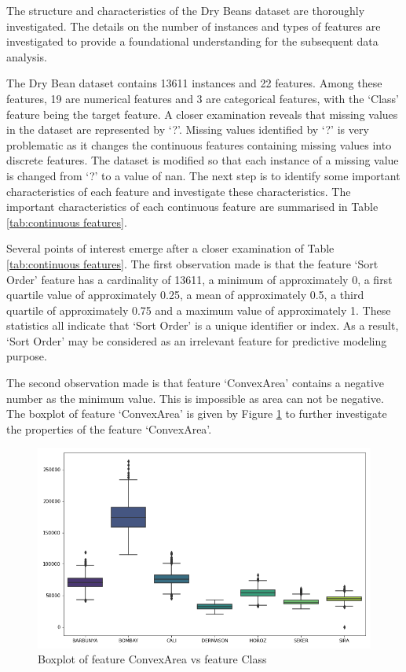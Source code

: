 \documentclass[10pt, conference]{IEEEtran}
\begin{document}
The structure and characteristics of the Dry Beans dataset are thoroughly investigated. The details on the number of instances
and types of features are investigated to provide a foundational understanding for the subsequent data analysis.

The Dry Bean dataset contains 13611 instances and 22 features. Among these features, 19 are numerical features and 3 are
categorical features, with the `Class' feature being the target feature. A closer examination reveals that
missing values in the dataset are represented by `?'. Missing values identified by `?' is very problematic as it changes
the continuous features containing missing values into discrete features. The dataset is modified so that each instance
of a missing value is changed from `?' to a value of \acrfull{nan}. The next step is to identify some important
characteristics of each feature and investigate these characteristics. The important characteristics of each
continuous feature are summarised in Table \ref{tab:continuous features}.

Several points of interest emerge after a closer examination of Table \ref{tab:continuous features}. The first
observation made is that the feature `Sort Order' feature has a cardinality of 13611, a minimum of approximately 0,
a first quartile value of approximately 0.25, a mean of approximately 0.5, a third quartile of approximately 0.75 and
a maximum value of approximately 1. These statistics all indicate that `Sort Order' is a unique identifier or index.
As a result, `Sort Order' may be considered as an irrelevant feature for predictive modeling purpose.

The second observation made is that feature `ConvexArea' contains a negative number as the minimum value. This is
impossible as area can not be negative. The boxplot of feature `ConvexArea' is given by Figure
\ref{ConvexArea_boxplot_negative} to further investigate the properties of the feature `ConvexArea'.
\begin{figure}[h!]
    \centerline{\includegraphics[scale=0.35]{../Plots/Negative ConvexArea boxplot.png}}
    \caption{Boxplot of feature ConvexArea vs feature Class}
    \label{ConvexArea_boxplot_negative}
\end{figure}
\end{document}
